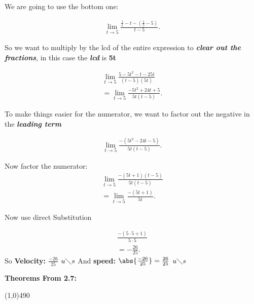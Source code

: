 \documentclass{report}
\begin{document}
        \bigbreak \noindent 
        We are going to use the bottom one:
        \bigbreak \noindent 

        \bigbreak \noindent 
        \begin{align*}
            \lim\limits_{t \to 5}{ \frac{ \frac{1}{t} - t  - ( \frac{1}{5} - 5)}{t -5}}
        .\end{align*}

        \bigbreak \noindent 
        So we want to multiply by the lcd of the entire expression to \textbf{\textit{clear out the fractions}},
        in this case the \textbf{\textit{lcd}} is \textbf{5t}

        \begin{align*}
            \lim\limits_{t \to 5}{ \frac{5 - 5t^2 - t-25t}{(t-5)(5t)}} \\ 
            = \lim\limits_{t \to 5}{ \frac{-5t^2+24t+5}{5t(t-5)}}
        .\end{align*}

        \bigbreak \noindent 
        To make things easier for the numerator, we want to factor out the negative in the \textbf{\textit{leading term}}

        \begin{align*}
            \lim\limits_{t \to 5}{ \frac{- (5t^2-24t-5)}{5t(t-5)}}
        .\end{align*}

        \bigbreak \noindent 
        Now factor the numerator:
        \begin{align*}
            \lim\limits_{t \to 5}{ \frac{- (5t+1)(t-5)}{5t(t-5)}} \\
            = \lim\limits_{t \to 5}{ \frac{-(5t+1)}{5t}}
        .\end{align*}

        \bigbreak \noindent 
        Now use direct Substitution

        \begin{align*}
            \frac{- (5 \cdot 5 + 1)}{5 \cdot 5} \\ 
            = - \frac{26}{25}
        .\end{align*}
        \bigbreak \noindent 
        So \textbf{Velocity: $ \frac{-26}{25}$ $u \diagdown s$} 
        \bigbreak \noindent 
        And \textbf{speed: $\abs{ \frac{-26}{25}} = \frac{26}{25}$ $u \diagdown s$ }

        \pagebreak \bigbreak \noindent
        \begin{Large}
            \begin{center}
                \textbf{Theorems From 2.7:}
            \end{center}
        \end{Large}
        \line(1,0){490}
\end{document}
